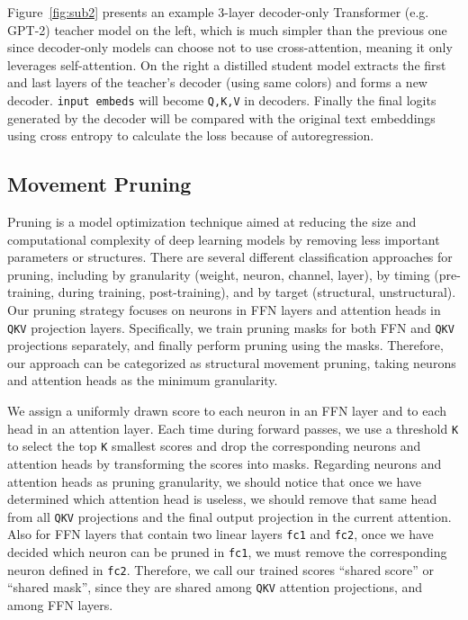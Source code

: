 \documentclass{article}
\begin{document}
    \hspace*{1em} Figure~\ref{fig:sub2} presents an example 3-layer decoder-only Transformer (e.g. GPT-2) teacher model on the left, which is much simpler than the previous one since decoder-only models can choose not to use cross-attention, meaning it only leverages self-attention. On the right a distilled student model extracts the first and last layers of the teacher's decoder (using same colors) and forms a new decoder. \texttt{input embeds} will become \texttt{Q,K,V} in decoders. Finally the final logits generated by the decoder will be compared with the original text embeddings using cross entropy to calculate the loss because of autoregression.


    \subsection{Movement Pruning}
    \hspace*{1em} Pruning is a model optimization technique aimed at reducing the size and computational complexity of deep learning models by removing less important parameters or structures. There are several different classification approaches for pruning, including by granularity (weight, neuron, channel, layer), by timing (pre-training, during training, post-training), and by target (structural, unstructural). Our pruning strategy focuses on neurons in FFN layers and attention heads in \texttt{QKV} projection layers. Specifically, we train pruning masks for both FFN and \texttt{QKV} projections separately, and finally perform pruning using the masks. Therefore, our approach can be categorized as structural movement pruning, taking neurons and attention heads as the minimum granularity.

    \hspace*{1em} We assign a uniformly drawn score to each neuron in an FFN layer and to each head in an attention layer. Each time during forward passes, we use a threshold \texttt{K} to select the top \texttt{K} smallest scores and drop the corresponding neurons and attention heads by transforming the scores into masks. Regarding neurons and attention heads as pruning granularity, we should notice that once we have determined which attention head is useless, we should remove that same head from all \texttt{QKV} projections and the final output projection in the current attention. Also for FFN layers that contain two linear layers \texttt{fc1} and \texttt{fc2}, once we have decided which neuron can be pruned in \texttt{fc1}, we must remove the corresponding neuron defined in \texttt{fc2}.  Therefore, we call our trained scores ``shared score'' or ``shared mask'', since they are shared among \texttt{QKV} attention projections, and among FFN layers.
\end{document}
